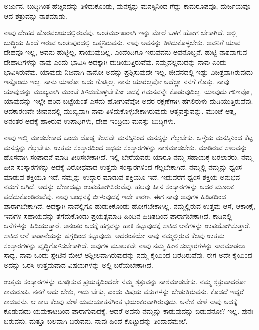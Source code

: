 \begin{artha}
ಅರ್ಜುನ, ಬುದ್ಧಿಗಿಂತ ಹೆಚ್ಚಿನದನ್ನು ತಿಳಿದುಕೊಂಡು, ಮನಸ್ಸನ್ನು ಮನಸ್ಸಿನಿಂದ ಗೆದ್ದು ಕಾಮ\-ರೂಪವೂ, ದುರ್ಜಯವೂ ಆದ ಶತ್ರುವನ್ನು ನಾಶಮಾಡು.
\end{artha}

ನಾವು ದೇಹದ ಹೊರವಲಯದಲ್ಲಿರುವೆವು. ಅಂತರ್ಮುಖರಾಗಿ ಇನ್ನು ಮೇಲೆ ಒಳಗೆ ಹೋಗ ಬೇಕಾಗಿದೆ. ಅಲ್ಲಿ ಬುದ್ಧಿಯ ಹಿಂದೆ ಇರುವ ಅಂತಃಪುರದಲ್ಲಿ ಆತ್ಮನಿರುವನು. ನಾವು ಅವನನ್ನು ತಿಳಿದುಕೊಳ್ಳಬೇಕು. ಅವನಿಗೆ ಯಾವ ದೇಹವೂ ಇಲ್ಲ, ಅವನು ಹುಟ್ಟಿಲ್ಲ, ಸಾಯುವುದಿಲ್ಲ. ಎಂದೆಂದಿಗೂ ಇರುವವನು ಅವನೊಬ್ಬನೆ. ಹುಟ್ಟಿ ನಾಶವಾಗುವ ದೇಹಾದಿಗಳನ್ನು ನಾವು ಎಂದು ಭಾವಿಸಿ ಅದಕ್ಕಾಗಿ ದುಡಿಯುತ್ತಿರುವೆವು. ನಮ್ಮದಲ್ಲದುದನ್ನು ನಾವು ಎಂದು ಭಾವಿಸಿರುವೆವು. ಯಾವುದು ನಿಜವಾಗಿ ನಾನೋ ಅದನ್ನು ಪ್ರಶ್ನಿಸುವುದೇ ಇಲ್ಲ. ಜೀವನದಲ್ಲಿ ಇಷ್ಟು ವಿಚಿತ್ರವಾಗಿರುವುದು ಇನ್ನೊಂದು ಇಲ್ಲ. ನಾನು ಯಾರೋ ಅದು ಗೊತ್ತಿಲ್ಲ. ನಾನು ಯಾರಲ್ಲವೋ ಅದೆಲ್ಲಾ ನನಗೆ ಗೊತ್ತು. ನಾವು ಯಾವುದನ್ನು ಮುಖ್ಯವಾಗಿ ಮುಂಚೆ ತಿಳಿದುಕೊಳ್ಳಬೇಕೋ ಅದಕ್ಕೆ ಗಮನವನ್ನೇ ಕೊಡುವುದಿಲ್ಲ. ಯಾವುದು ಗೌಣವೋ, ಯಾವುದನ್ನು ಇಲ್ಲೇ ಹರಿದ ಬಟ್ಟೆಯಂತೆ ಎಸೆದು ಹೋಗುವೆವೋ ಅದರ ರಕ್ಷಣೆಗಾಗಿ ಹಗಲಿರುಳು ದುಡಿಯುತ್ತಿರುವೆವು. ಆದಕಾರಣವೇ ಜೀವನದಲ್ಲಿ ಮುಖ್ಯವಾಗಿ ನಾವು ತಿಳಿದುಕೊಳ್ಳಬೇಕಾಗಿರುವುದು ಆತ್ಮವಸ್ತುವನ್ನು. ಮುಂಚೆ ಆತ್ಮ, ಅನಂತರ ಅದಕ್ಕೆ ಹಾಕಿರುವ ಉಪಾಧಿಗಳು, ದೇಹ ಇಂದ್ರಿಯ ಮನಸ್ಸು ಬುದ್ಧಿಗಳು.

ನಾವು ಇಲ್ಲಿ ಮಾಡಬೇಕಾದ ಒಂದು ದೊಡ್ಡ ಕೆಲಸವೇ ಮನಸ್ಸಿನಿಂದ ಮನಸ್ಸನ್ನು ಗೆಲ್ಲಬೇಕು. ಒಳ್ಳೆಯ ಮನಸ್ಸಿನಿಂದ ಕೆಟ್ಟ ಮನಸ್ಸನ್ನು ಗೆಲ್ಲಬೇಕು. ಉತ್ತಮ ಸಂಸ್ಕಾರದಿಂದ ಅಧಮ ಸಂಸ್ಕಾರಗಳನ್ನು ನಾಶಮಾಡಬೇಕು. ಮಾಡಿರುವ ಸಾಲವನ್ನು ಹೊಸದಾಗಿ ಸಂಪಾದನೆ ಮಾಡಿ ತೀರಿಸಬೇಕಾಗಿದೆ. ಇಲ್ಲಿ ಬೇರೆಯವರು ಯಾರೂ ನಮ್ಮ ಸಹಾಯಕ್ಕೆ ಬರಲಾರರು. ನಮ್ಮ ಹೀನ ಸಂಸ್ಕಾರಗಳನ್ನು ಅದಕ್ಕೆ ವಿರೋಧವಾದ ಉತ್ತಮ ಸಂಸ್ಕಾರಗಳಿಂದ ಗೆಲ್ಲಬೇಕಾಗಿದೆ. ನಮ್ಮಲ್ಲಿ ನಮ್ಮನ್ನು ಧ್ವಂಸ ಮಾಡುವ ಶಕ್ತಿಯೂ ಇದೆ, ನಮ್ಮನ್ನು ಉದ್ಧಾರ ಮಾಡುವ ಶಕ್ತಿಯೂ ಇದೆ. ಇದುವರೆಗೆ ಧ್ವಂಸ ಶಕ್ತಿಯ ಅನುಭವ ನಮಗೆ ಆಗಿದೆ. ಅದನ್ನು ಬೇಕಾದಷ್ಟು ಉಪಯೋಗಿಸಿರುವೆವು. ಹಲವು ಹೀನ ಸಂಸ್ಕಾರಗಳನ್ನು ಅದರ ಮೂಲಕ ಪಡೆದುಕೊಂಡಿರುವೆವು. ನಾವು ಬಂಧನಕ್ಕೆ ಬೀಳುವುದಕ್ಕೆ ಇದೇ ಕಾರಣ. ಈಗ ನಾವು ಅವುಗಳ ಹಿಡಿತದಿಂದ ಪಾರಾಗಬೇಕಾಗಿದೆ. ಅದಕ್ಕಾಗಿ ನಾವೆಲ್ಲಿಗೂ ಹುಡುಕಿಕೊಂಡು ಹೋಗಬೇಕಾಗಿಲ್ಲ. ನಮ್ಮಲ್ಲಿರುವ ಉತ್ತಮ ಆಸೆ, ಆಕಾಂಕ್ಷೆ, ಇವುಗಳ ಸಹಾಯವನ್ನು ತೆಗೆದುಕೊಂಡು ಪ್ರಯತ್ನಮಾಡಿ ಹಿಂದಿನ ಹಿಡಿತದಿಂದ ಪಾರಾಗಬೇಕಾಗಿದೆ. ಕಾಡಿನಲ್ಲಿ ಆನೆಗಳನ್ನು ಹಿಡಿಯುತ್ತಾರೆ. ಅನಂತರ ಅದಕ್ಕೆ ಹಗ್ಗವನ್ನು ಹಾಕಿ ಕಟ್ಟುವುದಕ್ಕೆ ಸಾಕಿದ ಆನೆಗಳನ್ನು ಉಪಯೋಗಿಸುತ್ತಾರೆ. ಸಾಕಿದ ಆನೆ ಕಾಡಾನೆಯನ್ನು ಹಗ್ಗದಿಂದ ಕಟ್ಟುವುದು. ಅದರಂತೆಯೇ ನಾವು ನಮ್ಮಲ್ಲಿರುವ ಕೆಲವು ಉತ್ತಮ ಸಂಸ್ಕಾರಗಳನ್ನು ವೃದ್ಧಿಗೊಳಿಸಬೇಕಾಗಿದೆ. ಅವುಗಳ ಮೂಲಕವೇ ನಾವು ನಮ್ಮ ಹೀನ ಸಂಸ್ಕಾರಗಳನ್ನು ನಾಶಮಾಡಲು ಸಾಧ್ಯ. ನಾವು ಒಂದು ಸ್ಲೇಟಿನ ಮೇಲೆ ಅಶ್ಲೀಲವಾಗಿರುವುದನ್ನು ನಮ್ಮ ಕೈಯಿಂದ ಬರೆದಿರುವೆವು. ಈಗ ಅದೇ ಕೈಯಿಂದ ಅದನ್ನು ಒರಸಿ ಉತ್ತಮವಾದ ವಿಷಯಗಳನ್ನು ಅಲ್ಲಿ ಬರೆಯಬೇಕಾಗಿದೆ.

ಉತ್ತಮ ಸಂಸ್ಕಾರಗಳನ್ನು ರೂಢಿಸುವ ಪ್ರಯತ್ನದಿಂದಲೇ ನಮ್ಮ ಶತ್ರುವನ್ನು ನಾಶಮಾಡಬೇಕು. ನಮ್ಮ ಶತ್ರುವಾದರೋ ಕಾಮರೂಪಿ. ನನಗೆ ಅದು ಬೇಕು, ಇದು ಬೇಕು, ಎಂದು ವಿಷಯ ವಸ್ತುಗಳನ್ನು ಬೇಡುತ್ತಿರುವನು. ಕೊಡದೆ ಇದ್ದರೆ ಕಾಡುವನು. ಆ ಕಾಟ ಕೆಲವು ವೇಳೆ ಯಮಯಾತನೆಗಿಂತ ಭಯಂಕರವಾಗಿರುವುದು. ಅನೇಕ ವೇಳೆ ನಾವು ಅದಕ್ಕೆ ಕೊಡುವುದು ಯಮಕಾಟದಿಂದ ಪಾರಾಗುವುದಕ್ಕೆ. ಆದರೆ ಅವನು ನಮ್ಮನ್ನು ಕಾಡುವುದನ್ನು ಬಿಡುವನೋ? ಇಲ್ಲ. ಪುನಃ ಬರುವನು. ಮತ್ತೂ ಬಲವಾಗಿ ಬರುವನು, ನಾವು ಹಿಂದೆ ಕೊಟ್ಟುದನ್ನು ತಿಂದಾದಮೇಲೆ.

